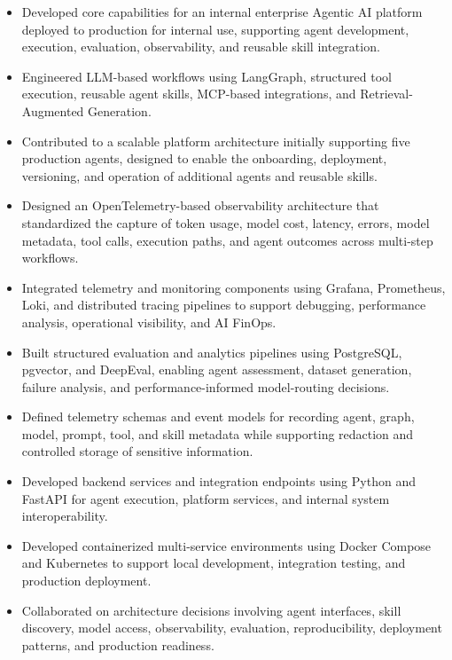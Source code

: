 \documentclass[10pt]{article}
\begin{document}
\begin{itemize}
    \item Developed core capabilities for an internal enterprise Agentic AI
    platform deployed to production for internal use, supporting agent
    development, execution, evaluation, observability, and reusable skill
    integration.

    \item Engineered LLM-based workflows using LangGraph, structured tool
    execution, reusable agent skills, MCP-based integrations, and
    Retrieval-Augmented Generation.

    \item Contributed to a scalable platform architecture initially supporting
    five production agents, designed to enable the onboarding, deployment,
    versioning, and operation of additional agents and reusable skills.

    \item Designed an OpenTelemetry-based observability architecture that
    standardized the capture of token usage, model cost, latency, errors,
    model metadata, tool calls, execution paths, and agent outcomes across
    multi-step workflows.

    \item Integrated telemetry and monitoring components using Grafana,
    Prometheus, Loki, and distributed tracing pipelines to support debugging,
    performance analysis, operational visibility, and AI FinOps.

    \item Built structured evaluation and analytics pipelines using
    PostgreSQL, pgvector, and DeepEval, enabling agent assessment, dataset
    generation, failure analysis, and performance-informed model-routing
    decisions.

    \item Defined telemetry schemas and event models for recording agent,
    graph, model, prompt, tool, and skill metadata while supporting
    redaction and controlled storage of sensitive information.

    \item Developed backend services and integration endpoints using Python
    and FastAPI for agent execution, platform services, and internal
    system interoperability.

    \item Developed containerized multi-service environments using Docker
    Compose and Kubernetes to support local development, integration testing,
    and production deployment.

    \item Collaborated on architecture decisions involving agent interfaces,
    skill discovery, model access, observability, evaluation, reproducibility,
    deployment patterns, and production readiness.
\end{itemize}
\end{document}
